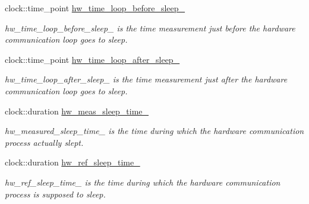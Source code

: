 \begin{DoxyCompactItemize}
clock\+::time\+\_\+point \hyperlink{classdynamic__graph_1_1DynamicGraphManager_a26167d2936575dfdbe31be4717b70cc5}{hw\+\_\+time\+\_\+loop\+\_\+before\+\_\+sleep\+\_\+}
\begin{DoxyCompactList}\small\item\em hw\+\_\+time\+\_\+loop\+\_\+before\+\_\+sleep\+\_\+ is the time measurement just before the hardware communication loop goes to sleep. \end{DoxyCompactList}\item 
\mbox{\label{classdynamic__graph_1_1DynamicGraphManager_a3641066efdd3424bb2bd745f6ba8d315}} 
clock\+::time\+\_\+point \hyperlink{classdynamic__graph_1_1DynamicGraphManager_a3641066efdd3424bb2bd745f6ba8d315}{hw\+\_\+time\+\_\+loop\+\_\+after\+\_\+sleep\+\_\+}
\begin{DoxyCompactList}\small\item\em hw\+\_\+time\+\_\+loop\+\_\+after\+\_\+sleep\+\_\+ is the time measurement just after the hardware communication loop goes to sleep. \end{DoxyCompactList}\item 
\mbox{\label{classdynamic__graph_1_1DynamicGraphManager_afb2f9b39e5c529d525999c3e91e06213}} 
clock\+::duration \hyperlink{classdynamic__graph_1_1DynamicGraphManager_afb2f9b39e5c529d525999c3e91e06213}{hw\+\_\+meas\+\_\+sleep\+\_\+time\+\_\+}
\begin{DoxyCompactList}\small\item\em hw\+\_\+measured\+\_\+sleep\+\_\+time\+\_\+ is the time during which the hardware communication process actually slept. \end{DoxyCompactList}\item 
\mbox{\label{classdynamic__graph_1_1DynamicGraphManager_aa89f848a27f201aed320e2c6a441dc02}} 
clock\+::duration \hyperlink{classdynamic__graph_1_1DynamicGraphManager_aa89f848a27f201aed320e2c6a441dc02}{hw\+\_\+ref\+\_\+sleep\+\_\+time\+\_\+}
\begin{DoxyCompactList}\small\item\em hw\+\_\+ref\+\_\+sleep\+\_\+time\+\_\+ is the time during which the hardware communication process is supposed to sleep. \end{DoxyCompactList}\item 
\mbox{\label{classdynamic__graph_1_1DynamicGraphManager_af4c9ca6b9c161ac578b6726eaa7b7826}} 

\end{DoxyCompactItemize}
